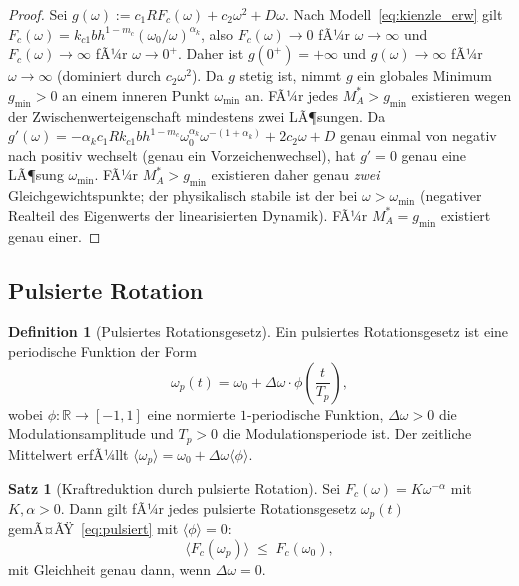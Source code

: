 ﻿\documentclass[a4paper,12pt]{article}
\theoremstyle{definition}
\newtheorem{definition}{Definition}
\newtheorem{satz}{Satz}
\begin{document}
\begin{proof}
Sei $g(\omega) := c_1 R F_c(\omega) + c_2 \omega^2 + D\omega$. Nach Modell~\eqref{eq:kienzle_erw}
gilt $F_c(\omega) = k_{c1} b h^{1-m_c} (\omega_0/\omega)^{\alpha_k}$, also $F_c(\omega) \to 0$
fÃ¼r $\omega \to \infty$ und $F_c(\omega) \to \infty$ fÃ¼r $\omega \to 0^+$. Daher ist
$g(0^+) = +\infty$ und $g(\omega) \to \infty$ fÃ¼r $\omega \to \infty$ (dominiert durch $c_2\omega^2$).
Da $g$ stetig ist, nimmt $g$ ein globales Minimum $g_{\min} > 0$ an einem inneren Punkt $\omega_{\min}$ an.
FÃ¼r jedes $M_A^* > g_{\min}$ existieren wegen der Zwischenwerteigenschaft mindestens zwei LÃ¶sungen.
Da $g'(\omega) = -\alpha_k c_1 R k_{c1} b h^{1-m_c} \omega_0^{\alpha_k} \omega^{-(1+\alpha_k)} + 2c_2\omega + D$
genau einmal von negativ nach positiv wechselt (genau ein Vorzeichenwechsel), hat $g' = 0$ genau
eine LÃ¶sung $\omega_{\min}$. FÃ¼r $M_A^* > g_{\min}$ existieren daher genau \emph{zwei}
Gleichgewichtspunkte; der physikalisch stabile ist der bei $\omega > \omega_{\min}$ (negativer
Realteil des Eigenwerts der linearisierten Dynamik). FÃ¼r $M_A^* = g_{\min}$ existiert genau einer.
\end{proof}

\subsection{Pulsierte Rotation}

\begin{definition}[Pulsiertes Rotationsgesetz]
Ein pulsiertes Rotationsgesetz ist eine periodische Funktion der Form
\begin{equation}
\label{eq:pulsiert}
\omega_p(t) = \omega_0 + \Delta\omega \cdot \phi\!\left(\frac{t}{T_p}\right),
\end{equation}
wobei $\phi: \mathbb{R} \to [-1,1]$ eine normierte $1$-periodische Funktion,
$\Delta\omega > 0$ die Modulationsamplitude und $T_p > 0$ die Modulationsperiode ist.
Der zeitliche Mittelwert erfÃ¼llt $\langle \omega_p \rangle = \omega_0 + \Delta\omega \langle\phi\rangle$.
\end{definition}

\begin{satz}[Kraftreduktion durch pulsierte Rotation]
\label{satz:kraftreduktion}
Sei $F_c(\omega) = K \omega^{-\alpha}$ mit $K, \alpha > 0$. Dann gilt fÃ¼r jedes pulsierte
Rotationsgesetz $\omega_p(t)$ gemÃ¤ÃŸ~\eqref{eq:pulsiert} mit $\langle\phi\rangle = 0$:
\[
\langle F_c(\omega_p) \rangle \;\leq\; F_c(\omega_0),
\]
mit Gleichheit genau dann, wenn $\Delta\omega = 0$.
\end{satz}
\end{document}
